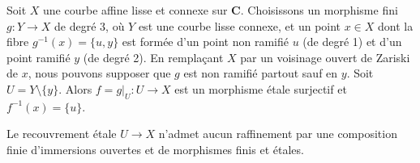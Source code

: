\medskip\noindent
Soit $X$ une courbe affine lisse et connexe sur $\mathbf{C}$.
Choisissons un morphisme fini $g: Y \to X$ de degré $3$, où
$Y$ est une courbe lisse connexe, et un point $x \in X$
dont la fibre $g^{-1}(x) = \{u, y\}$ est formée d'un point non ramifié
$u$ (de degré 1) et d'un point ramifié $y$ (de degré 2). En remplaçant
$X$ par un voisinage ouvert de Zariski de $x$, nous pouvons supposer que $g$
est non ramifié partout sauf en $y$. Soit $U = Y \setminus \{y\}$.
Alors $f=g|_U: U \to X$ est un morphisme \'etale surjectif et
$f^{-1}(x) = \{u\}$. 

\begin{lemma}
\label{lemma-etale-not-dominated-zariski-finite-etale}
Le recouvrement \'etale $U \to X$ n'admet aucun raffinement par une composition finie
d'immersions ouvertes et de morphismes finis et \'etales.
\end{lemma}


